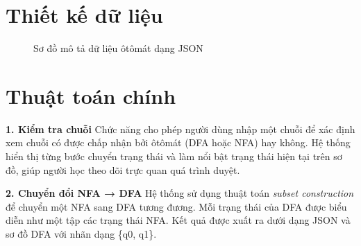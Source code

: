 \documentclass[12pt,a4paper]{report}
\begin{document}
\section{Thiết kế dữ liệu}
\begin{figure}[H]
\centering
{}

\caption{Sơ đồ mô tả dữ liệu ôtômát dạng JSON}
\label{fig:json_bubble}
\end{figure}


\section{Thuật toán chính}

\hspace*{0.7cm}\textbf{1. Kiểm tra chuỗi}
Chức năng cho phép người dùng nhập một chuỗi để xác định xem chuỗi có được chấp nhận bởi ôtômát (DFA hoặc NFA) hay không. Hệ thống hiển thị từng bước chuyển trạng thái và làm nổi bật trạng thái hiện tại trên sơ đồ, giúp người học theo dõi trực quan quá trình duyệt.

\textbf{2. Chuyển đổi NFA → DFA}
Hệ thống sử dụng thuật toán \textit{subset construction} để chuyển một NFA sang DFA tương đương. Mỗi trạng thái của DFA được biểu diễn như một tập các trạng thái NFA. Kết quả được xuất ra dưới dạng JSON và sơ đồ DFA với nhãn dạng \{q0, q1\}.
\end{document}
